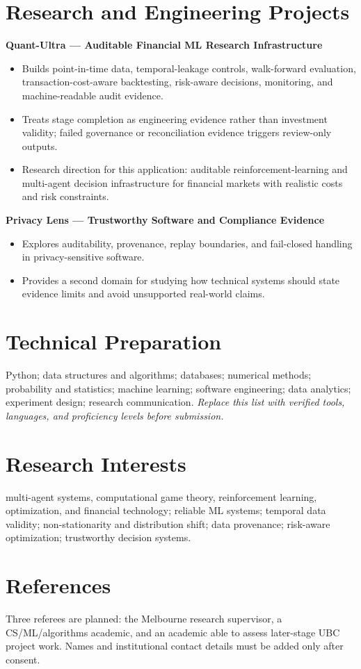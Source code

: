 \documentclass[11pt]{article}
\begin{document}
\section*{Research and Engineering Projects}
\textbf{Quant-Ultra --- Auditable Financial ML Research Infrastructure}
\begin{itemize}
\item Builds point-in-time data, temporal-leakage controls, walk-forward evaluation, transaction-cost-aware backtesting, risk-aware decisions, monitoring, and machine-readable audit evidence.
\item Treats stage completion as engineering evidence rather than investment validity; failed governance or reconciliation evidence triggers review-only outputs.
\item Research direction for this application: auditable reinforcement-learning and multi-agent decision infrastructure for financial markets with realistic costs and risk constraints.
\end{itemize}

\begin{samepage}
\textbf{Privacy Lens --- Trustworthy Software and Compliance Evidence}
\begin{itemize}
\item Explores auditability, provenance, replay boundaries, and fail-closed handling in privacy-sensitive software.
\item Provides a second domain for studying how technical systems should state evidence limits and avoid unsupported real-world claims.
\end{itemize}
\end{samepage}

\section*{Technical Preparation}
Python; data structures and algorithms; databases; numerical methods; probability and statistics; machine learning; software engineering; data analytics; experiment design; research communication. \textit{Replace this list with verified tools, languages, and proficiency levels before submission.}

\section*{Research Interests}
multi-agent systems, computational game theory, reinforcement learning, optimization, and financial technology; reliable ML systems; temporal data validity; non-stationarity and distribution shift; data provenance; risk-aware optimization; trustworthy decision systems.

\section*{References}
Three referees are planned: the Melbourne research supervisor, a CS/ML/algorithms academic, and an academic able to assess later-stage UBC project work. Names and institutional contact details must be added only after consent.
\end{document}
